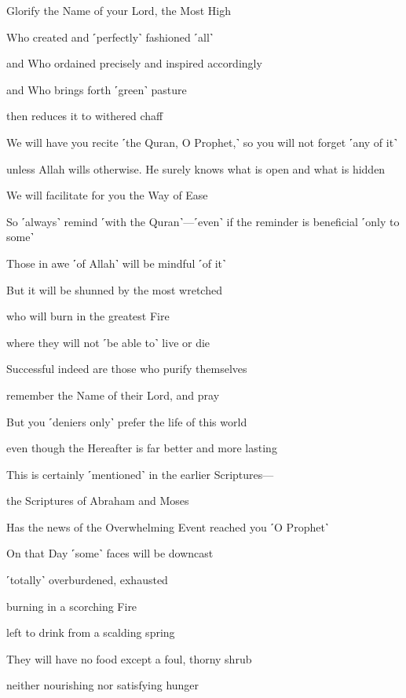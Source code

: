 Glorify the Name of your Lord, the Most High

Who created and ˹perfectly˺ fashioned ˹all˺

and Who ordained precisely and inspired accordingly

and Who brings forth ˹green˺ pasture

then reduces it to withered chaff

We will have you recite ˹the Quran, O Prophet,˺ so you will not forget ˹any of it˺

unless Allah wills otherwise. He surely knows what is open and what is hidden

We will facilitate for you the Way of Ease

So ˹always˺ remind ˹with the Quran˺—˹even˺ if the reminder is beneficial ˹only to some˺

Those in awe ˹of Allah˺ will be mindful ˹of it˺

But it will be shunned by the most wretched

who will burn in the greatest Fire

where they will not ˹be able to˺ live or die

Successful indeed are those who purify themselves

remember the Name of their Lord, and pray

But you ˹deniers only˺ prefer the life of this world

even though the Hereafter is far better and more lasting

This is certainly ˹mentioned˺ in the earlier Scriptures—

the Scriptures of Abraham and Moses

Has the news of the Overwhelming Event reached you ˹O Prophet˺

On that Day ˹some˺ faces will be downcast

˹totally˺ overburdened, exhausted

burning in a scorching Fire

left to drink from a scalding spring

They will have no food except a foul, thorny shrub

neither nourishing nor satisfying hunger

